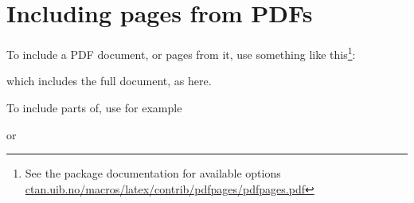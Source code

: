\chapter{Including pages from PDFs}
\label{chap:pdfs} 

To include a PDF document, or pages from it, use something like this\footnote{See the package documentation for available options \url{ctan.uib.no/macros/latex/contrib/pdfpages/pdfpages.pdf}}: 

\verb||

which includes the full document, as here\cite{holone2007users}.

To include parts of, use for example

\verb|| 

or 

\verb||


